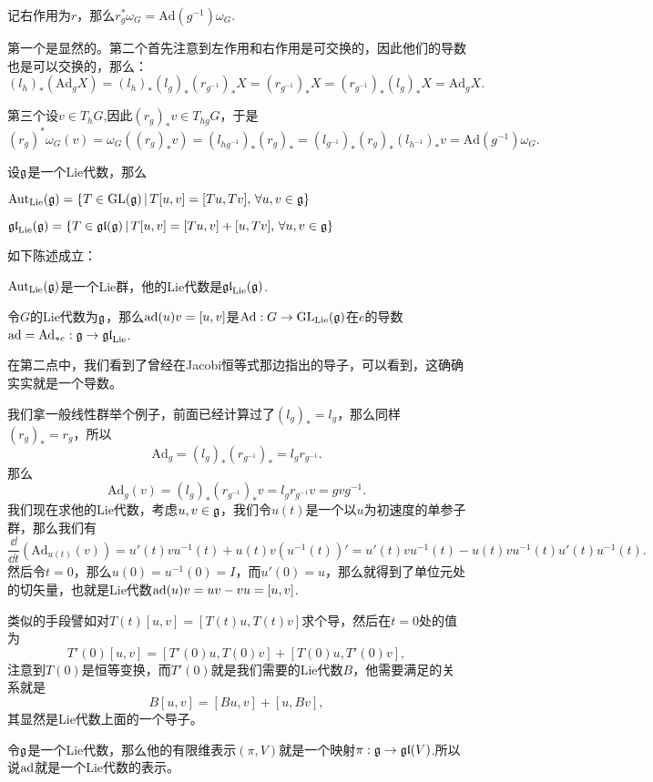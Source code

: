  记右作用为$r$，那么$r_g^*\omega_G=\mathrm{Ad}(g^{-1})\omega_G$.


第一个是显然的。第二个首先注意到左作用和右作用是可交换的，因此他们的导数也是可以交换的，那么：
\[
	(l_h)_*(\mathrm{Ad}_gX)=(l_h)_*(l_g)_*(r_{g^{-1}})_*X=(r_{g^{-1}})_*X=(r_{g^{-1}})_*(l_g)_*X=\mathrm{Ad}_gX.
\]

第三个设$v\in T_hG$,因此$(r_g)_*v\in T_{hg}G$，于是
\[
	(r_g)^*\omega_G(v)=\omega_G((r_g)_*v)=(l_{{hg}^{-1}})_*(r_g)_*
	=(l_{{g}^{-1}})_*(r_g)_*(l_{{h}^{-1}})_*v=\mathrm{Ad}(g^{-1})\omega_G.
\]

\para 设${\mathfrak{g}}$是一个Lie代数，那么

 $\mathrm{Aut}_{\mathrm{Lie}}({\mathfrak{g}})=\{T\in \mathrm{GL}({\mathfrak{g}})\,|\,T[u,v]=[Tu,Tv],\,\forall u,v\in{\mathfrak{g}}\}$

 $\mathfrak{gl}_{\mathrm{Lie}}({\mathfrak{g}})=\{T\in \mathfrak{gl}({\mathfrak{g}})\,|\,T[u,v]=[Tu,v]+[u,Tv],\,\forall u,v\in{\mathfrak{g}}\}$

\para 如下陈述成立：

 $\mathrm{Aut}_{\mathrm{Lie}}({\mathfrak{g}})$是一个Lie群，他的Lie代数是$\mathfrak{gl}_{\mathrm{Lie}}({\mathfrak{g}})$.

 令$G$的Lie代数为${\mathfrak{g}}$，那么$\operatorname{ad}(u)v=[u,v]$是$\mathrm{Ad}:G\to \mathrm{GL}_{\mathrm{Lie}}({\mathfrak{g}})$在$e$的导数$\operatorname{ad}=\mathrm{Ad}_{*e}:{\mathfrak{g}}\to \mathfrak{gl}_{\mathrm{Lie}}$.

在第二点中，我们看到了曾经在Jacobi恒等式那边指出的导子，可以看到，这确确实实就是一个导数。

我们拿一般线性群举个例子，前面已经计算过了$(l_g)_*=l_g$，那么同样$(r_g)_*=r_g$，所以
\[
	\mathrm{Ad}_g=(l_g)_*(r_{g^{-1}})_*=l_gr_{g^{-1}}.
\]
那么
\[
	\mathrm{Ad}_g(v)=(l_g)_*(r_{g^{-1}})_*v=l_gr_{g^{-1}}v=gvg^{-1}.
\]
我们现在求他的Lie代数，考虑$u,v\in {\mathfrak{g}}$，我们令$u(t)$是一个以$u$为初速度的单参子群，那么我们有
\[
\frac{\dd}{\dd t}(\mathrm{Ad}_{u(t)}(v))=u'(t)vu^{-1}(t)+u(t)v(u^{-1}(t))'=u'(t)vu^{-1}(t)-u(t)vu^{-1}(t)u'(t)u^{-1}(t).
\]
然后令$t=0$，那么$u(0)=u^{-1}(0)=I$，而$u'(0)=u$，那么就得到了单位元处的切矢量，也就是Lie代数$\operatorname{ad}(u)v=uv-vu=[u,v]$.

类似的手段譬如对$T(t)[u,v]=[T(t)u,T(t)v]$求个导，然后在$t=0$处的值为
\[
T'(0)[u,v]=[T'(0)u,T(0)v]+[T(0)u,T'(0)v],
\]
注意到$T(0)$是恒等变换，而$T'(0)$就是我们需要的Lie代数$B$，他需要满足的关系就是
\[
B[u,v]=[Bu,v]+[u,Bv],
\]
其显然是Lie代数上面的一个导子。

\para 令${\mathfrak{g}}$是一个Lie代数，那么他的有限维表示$(\pi,V)$就是一个映射$\pi:{\mathfrak{g}}\to\mathfrak{gl}(V)$.所以说$\operatorname{ad}$就是一个Lie代数的表示。

